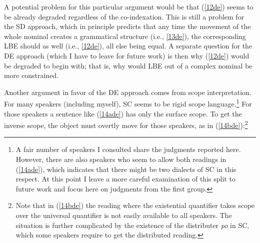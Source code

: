 \documentclass[output=paper]{langscibook}
\begin{document}
\begin{exe}


\end{exe}

A potential problem for this particular argument would be that (\ref{12de}) seems to be already degraded regardless of the co-indexation. This is still a problem for the SD approach, which in principle predicts that any time the movement of the whole nominal creates a grammatical structure (i.e., \ref{13de}), the corresponding LBE should as well (i.e., \ref{12de}), all else being equal. A separate question for the DE approach (which I have to leave for future work) is then why (\ref{12de}) would be degraded to begin with; that is, why would LBE out of a complex nominal be more constrained.

Another argument in favor of the DE approach comes from scope interpretation. For many speakers (including myself), SC seems to be rigid scope language.\footnote{A fair number of speakers I consulted share the judgments reported here. However, there are also speakers who seem to allow both readings in (\ref{14ade}), which indicates that there might be two dialects of SC in this respect. At this point I leave a more careful examination of this split to future work and focus here on judgments from the first group.} For those speakers a sentence like (\ref{14ade}) has only the surface scope. To get the inverse scope, the object must overtly move for those speakers, as in (\ref{14bde}):\footnote{Note that in (\ref{14bde}) the reading where the existential quantifier takes scope over the universal quantifier is not easily available to all speakers. The situation is further complicated by the existence of the distributer \textit{po} in SC, which some speakers require to get the distributed reading.} 
\end{document}
